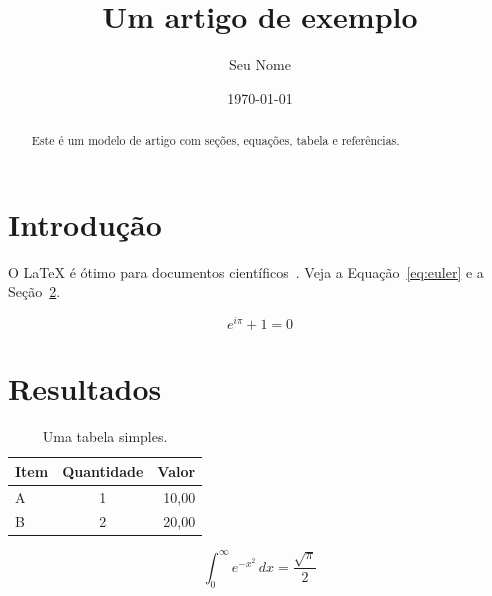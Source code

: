 \documentclass[12pt,a4paper]{article}
\title{Um artigo de exemplo}
\author{Seu Nome}
\date{\today}
\begin{document}
\maketitle

\begin{abstract}
Este é um modelo de artigo com seções, equações, tabela e referências.
\end{abstract}

\section{Introdução}
\label{sec:intro}
O \LaTeX{} é ótimo para documentos científicos~\cite{lamport1994}.
Veja a Equação~\eqref{eq:euler} e a Seção~\ref{sec:resultados}.

\begin{equation}
  e^{i\pi} + 1 = 0
  \label{eq:euler}
\end{equation}

\section{Resultados}
\label{sec:resultados}

\begin{table}[h]
  \centering
  \begin{tabular}{lcr}
    \hline
    Item & Quantidade & Valor \\
    \hline
    A & 1 & 10,00 \\
    B & 2 & 20,00 \\
    \hline
  \end{tabular}
  \caption{Uma tabela simples.}
\end{table}

\[
  \int_0^\infty e^{-x^2}\,dx = \frac{\sqrt{\pi}}{2}
\]



\end{document}
